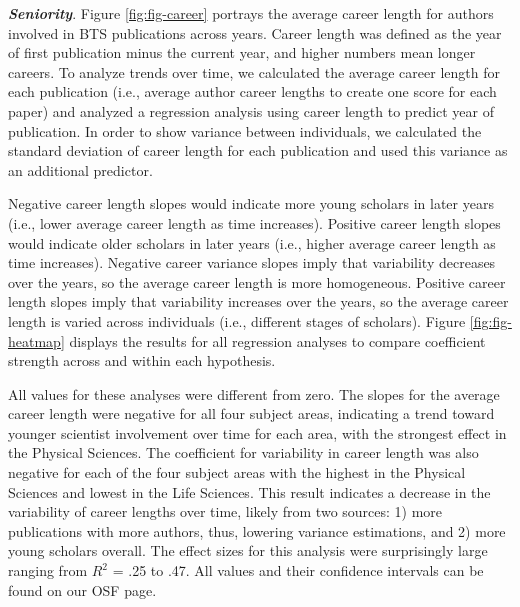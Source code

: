 \documentclass[
  man,floatsintext]{apa6}
\begin{document}
\textbf{\emph{Seniority}}. Figure \ref{fig:fig-career} portrays the average career length for
authors involved in BTS publications across years. Career length was
defined as the year of first publication minus the current year, and
higher numbers mean longer careers. To analyze trends over time, we
calculated the average career length for each publication (i.e., average
author career lengths to create one score for each paper) and analyzed a
regression analysis using career length to predict year of publication.
In order to show variance between individuals, we calculated the
standard deviation of career length for each publication and used this
variance as an additional predictor.

Negative career length slopes would indicate more young scholars in
later years (i.e., lower average career length as time increases).
Positive career length slopes would indicate older scholars in later
years (i.e., higher average career length as time increases). Negative
career variance slopes imply that variability decreases over the years,
so the average career length is more homogeneous. Positive career length
slopes imply that variability increases over the years, so the average
career length is varied across individuals (i.e., different stages of
scholars). Figure \ref{fig:fig-heatmap} displays the results for all
regression analyses to compare coefficient strength across and within
each hypothesis.

All values for these analyses were different from zero. The slopes for
the average career length were negative for all four subject areas,
indicating a trend toward younger scientist involvement over time for
each area, with the strongest effect in the Physical Sciences. The
coefficient for variability in career length was also negative for each
of the four subject areas with the highest in the Physical Sciences and
lowest in the Life Sciences. This result indicates a decrease in the
variability of career lengths over time, likely from two sources: 1)
more publications with more authors, thus, lowering variance
estimations, and 2) more young scholars overall. The effect sizes for
this analysis were surprisingly large ranging from \(R^2\) = .25 to .47.
All values and their confidence intervals can be found on our OSF page.
\end{document}
